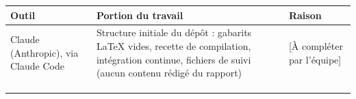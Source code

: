 {\renewcommand{\arraystretch}{1.3}
\noindent\begin{tabularx}{\linewidth}{@{}p{3.5cm}XX@{}}
\toprule
\textbf{Outil} & \textbf{Portion du travail} & \textbf{Raison} \\
\midrule
Claude (Anthropic), via Claude Code & Structure initiale du dépôt : gabarits LaTeX vides, recette de compilation, intégration continue, fichiers de suivi (aucun contenu rédigé du rapport) & [À compléter par l'équipe] \\ \midrule
\rule{0pt}{2em} & & \\ \midrule
\rule{0pt}{2em} & & \\ \midrule
\rule{0pt}{2em} & & \\
\bottomrule
\end{tabularx}\par}
